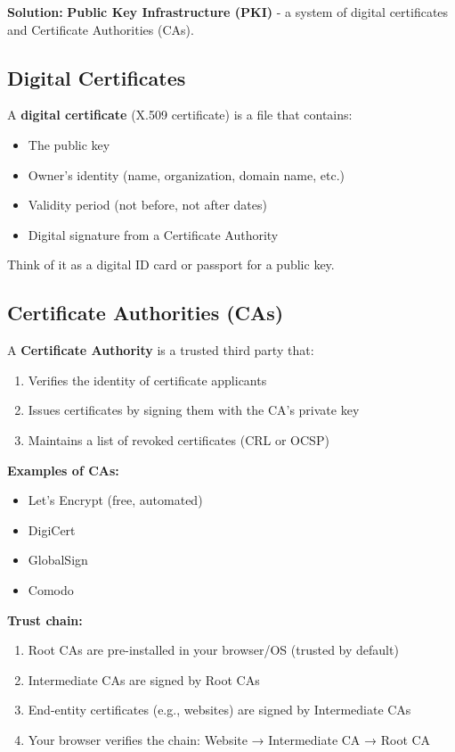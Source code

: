 \documentclass[11pt,a4paper]{report}
\begin{document}
\textbf{Solution:} \textbf{Public Key Infrastructure (PKI)} - a system of digital certificates and Certificate Authorities (CAs).

\subsection{Digital Certificates}

A \textbf{digital certificate} (X.509 certificate) is a file that contains:
\begin{itemize}
\item The public key
\item Owner's identity (name, organization, domain name, etc.)
\item Validity period (not before, not after dates)
\item Digital signature from a Certificate Authority
\end{itemize}

Think of it as a digital ID card or passport for a public key.

\subsection{Certificate Authorities (CAs)}

A \textbf{Certificate Authority} is a trusted third party that:
\begin{enumerate}
\item Verifies the identity of certificate applicants
\item Issues certificates by signing them with the CA's private key
\item Maintains a list of revoked certificates (CRL or OCSP)
\end{enumerate}

\textbf{Examples of CAs:}
\begin{itemize}
\item Let's Encrypt (free, automated)
\item DigiCert
\item GlobalSign
\item Comodo
\end{itemize}

\textbf{Trust chain:}
\begin{enumerate}
\item Root CAs are pre-installed in your browser/OS (trusted by default)
\item Intermediate CAs are signed by Root CAs
\item End-entity certificates (e.g., websites) are signed by Intermediate CAs
\item Your browser verifies the chain: Website → Intermediate CA → Root CA
\end{enumerate}
\end{document}
